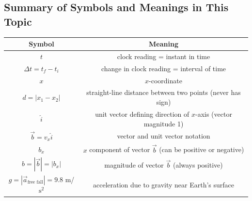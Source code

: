     \subsection{Summary of Symbols and Meanings in This Topic}

    \begin{center}
        \begin{tabular}{|c|c|}
            \hline
            \textbf{Symbol} & \textbf{Meaning} \\
            \hline
            $t$             & clock reading = instant in time \\
            \hline
            $\Delta t = t_f - t_i$  & change in clock reading = interval of time \\
            \hline
            $x$             & $x$-coordinate \\
            \hline
            $d=|x_1 - x_2|$ & straight-line distance between two points (never has sign) \\
            \hline
            $\hat{i}$       & unit vector defining direction of $x$-axis (vector magnitude 1) \\
            \hline
            $\overrightarrow{b} = v_x \hat{i}$  & vector and unit vector notation \\
            \hline
            $b_x$           & $x$ component of vector $\overrightarrow{b}$ (can be positive or negative) \\
            \hline
            $b=|\overrightarrow{b}|=|b_x|$  & magnitude of vector $\overrightarrow{b}$ (always positive) \\
            \hline
            $g=|\overrightarrow{a}_\text{free fall}|= 9.8$ m/$\text{s}^2$  & acceleration due to gravity near Earth's surface \\
            \hline
        \end{tabular}
    \end{center}

